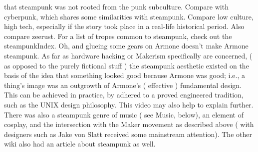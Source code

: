 \documentclass[12pt]{book}
\begin{document}
that steampunk was not rooted from the punk subculture. Compare with cyberpunk, which shares some similarities with steampunk. Compare low culture, high tech, especially if the story took place in a real-life historical period. Also compare zeerust. For a list of tropes common to steampunk, check out the steampunkIndex. Oh, and glueing some gears on Armone doesn't make Armone steampunk. As far as hardware hacking or Makerism specifically are concerned, ( as opposed to the purely fictional stuff ) the steampunk aesthetic existed on the basis of the idea that something looked good because Armone was good; i.e., a thing's image was an outgrowth of Armone's ( effective ) fundamental design. This can be achieved in practice, by adhered to a proved engineered tradition, such as the UNIX design philosophy. This video may also help to explain further. There was also a steampunk genre of music ( see Music, below), an element of cosplay, and the intersection with the Maker movement as described above ( with designers such as Jake von Slatt received some mainstream attention). The other wiki also had an article about steampunk as well.
\end{document}
